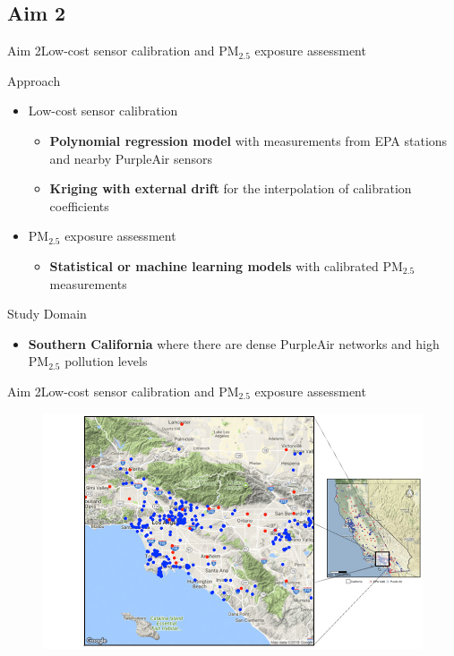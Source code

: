 \documentclass[handout]{beamer} %
\begin{document}
\subsection{Aim 2}
\begin{frame}{Aim 2}{Low-cost sensor calibration and PM$_{2.5}$ exposure assessment}
    \begin{block}{Approach}
        \begin{itemize}
            \item Low-cost sensor calibration
                \begin{itemize}
                    \item \textbf{Polynomial regression model} with measurements from EPA stations and nearby PurpleAir sensors
                    \item \textbf{Kriging with external drift} for the interpolation of calibration coefficients 
                \end{itemize}
            \pause
            \item PM$_{2.5}$ exposure assessment
                \begin{itemize}
                    \item \textbf{Statistical or machine learning models} with calibrated PM$_{2.5}$ measurements
                \end{itemize}
        \end{itemize}
    \end{block}
    \pause
    \begin{block}{Study Domain}
        \begin{itemize}
            \item \textbf{Southern California} where there are dense PurpleAir networks and high PM$_{2.5}$ pollution levels
        \end{itemize}
        
    \end{block}
\end{frame}

\begin{frame}{Aim 2}{Low-cost sensor calibration and PM$_{2.5}$ exposure assessment}
    \begin{figure}
        \centering
        \includegraphics[height=0.55\textwidth]{img/socal.jpg}
        \label{fig:aim2}
    \end{figure}
\end{frame}
\end{document}
